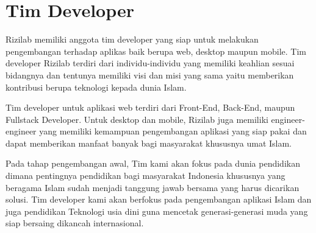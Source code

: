 \documentclass[Rizilab.tex]{subfile}
\begin{document}
  \section{Tim Developer}
  Rizilab memiliki anggota tim developer yang siap untuk melakukan pengembangan terhadap
  aplikas baik berupa web, desktop maupun mobile. Tim developer Rizilab terdiri dari individu-individu yang memiliki keahlian sesuai bidangnya dan tentunya memiliki visi dan misi yang sama yaitu memberikan kontribusi berupa teknologi kepada dunia Islam.

  Tim developer untuk aplikasi web terdiri dari Front-End, Back-End, maupun Fullstack Developer. Untuk desktop dan mobile, Rizilab juga memiliki engineer-engineer yang memiliki kemampuan pengembangan aplikasi yang siap pakai dan dapat memberikan manfaat banyak bagi masyarakat khususnya umat Islam.

  Pada tahap pengembangan awal, Tim kami akan fokus pada dunia pendidikan dimana pentingnya pendidikan bagi masyarakat Indonesia khususnya yang beragama Islam sudah menjadi tanggung jawab bersama yang harus dicarikan solusi. Tim developer kami akan berfokus pada pengembangan aplikasi Islam dan juga pendidikan Teknologi usia dini guna mencetak generasi-generasi muda yang siap bersaing dikancah internasional.
\end{document}
